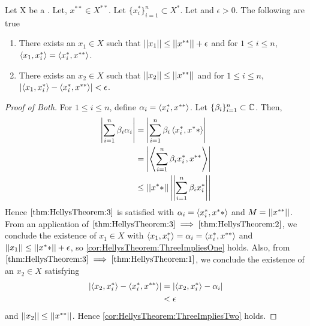 \begin{cor}
    \label{cor:HellysTheorem}
    Let X be a \SeminormedSpace.
    Let, $x^{**} \in X^{**}$.
    Let $\{x_i^*\}_{i=1}^n \subset X^*$.
    Let and $\epsilon > 0$. 
    The following are true
    \begin{enumerate}[label=(\roman*), ref={\ref{cor:HellysTheorem}~\roman*}]
        \item 
        \label{cor:HellysTheorem:ThreeImpliesOne}
        There exists an $x_1 \in X$ 
        such that $\left|\left| x_1 \right|\right| \leq \left|\left| x^{**} \right|\right|+\epsilon$ 
        and for $1 \leq i \leq n$, 
        $\left\langle x_1,x_i^* \right\rangle = \left\langle x_i^*,x^{**} \right\rangle$.  
        \item 
        \label{cor:HellysTheorem:ThreeImpliesTwo}
        There exists an $x_2 \in X$ 
        such that $\left|\left| x_2 \right|\right| \leq \left|\left| x^{**} \right|\right|$ 
        and for $1 \leq i \leq n$, 
        $\left| \left\langle x_1,x_i^* \right\rangle-\left\langle x_i^*,x^{**} \right\rangle \right| < \epsilon$. 
    \end{enumerate} 
    \begin{proof}[Proof of Both]
    For $1 \leq i \leq n$, define $\alpha_i = \left\langle x_i^*, x^{**} \right\rangle$. 
    Let $\{\beta_i\}_{i=1}^n \subset \mathbb{C}$. 
    Then, 
    \begin{align*}
    \left| \sum\limits_{i=1}^n \beta_i \alpha_i \right|
    & = \left| \sum\limits_{i=1}^n \beta_i \left\langle x_i^*, x^** \right\rangle \right|\\
    & = \left| \left\langle \sum\limits_{i=1}^n \beta_i x_i^*, x^{**} \right\rangle \right|\\
    & \leq \left|\left| x^** \right|\right| \left|\left| \sum\limits_{i=1}^n \beta_i x_i^* \right|\right|
    \end{align*}
    Hence $\ref{thm:HellysTheorem:3}$ is satisfied with $\alpha_i=\left\langle x_i^*, x^** \right\rangle$ 
    and $M = \left|\left| x^{**} \right|\right|$. 
    From an application of 
    $\ref{thm:HellysTheorem:3} \implies \ref{thm:HellysTheorem:2}$, 
    we conclude the existence of 
    $x_{1} \in X$ 
    with 
    $\left\langle x_1, x_i^* \right\rangle = \alpha_i = \left\langle x_i^*, x^{**} \right\rangle$ 
    and 
    $\left|\left| x_1 \right|\right| \leq \left|\left| x^** \right|\right|+\epsilon$, 
    so \ref{cor:HellysTheorem:ThreeImpliesOne} holds.
    Also, from 
    $\ref{thm:HellysTheorem:3} \implies \ref{thm:HellysTheorem:1}$, 
    we conclude the existence of an 
    $x_2 \in X$ 
    satisfying
    \begin{align*}
        \left| \left\langle x_2, x_i^* \right\rangle - \left\langle x_i^*, x^{**} \right\rangle \right| 
        & = \left| \left\langle x_2, x_i^* \right\rangle - \alpha_i \right| \\
        & < \epsilon
    \end{align*}
    and $\left|\left| x_2 \right|\right| \leq \left|\left| x^{**} \right|\right|$. 
    Hence \ref{cor:HellysTheorem:ThreeImpliesTwo} holds.
    \end{proof}
\end{cor} 

